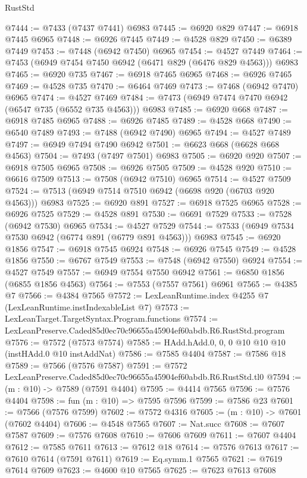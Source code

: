 \begin{lexlean}{RustStd}
\begin{coremodule}
@7444 := @7433 (@7437 @7441) @6983
@7445 := @6920 @829
@7447 := @6918 @7445 @6965
@7448 := @6926 @7445
@7449 := @4528 @829
@7450 := @6389 @7449
@7453 := @7448 (@6942 @7450) @6965
@7454 := @4527 @7449
@7464 := @7453 (@6949 @7454 @7450 @6942 (@6471 @829 (@6476 @829 @4563))) @6983
@7465 := @6920 @735
@7467 := @6918 @7465 @6965
@7468 := @6926 @7465
@7469 := @4528 @735
@7470 := @6464 @7469
@7473 := @7468 (@6942 @7470) @6965
@7474 := @4527 @7469
@7484 := @7473 (@6949 @7474 @7470 @6942 (@6547 @735 (@6552 @735 @4563))) @6983
@7485 := @6920 @668
@7487 := @6918 @7485 @6965
@7488 := @6926 @7485
@7489 := @4528 @668
@7490 := @6540 @7489
@7493 := @7488 (@6942 @7490) @6965
@7494 := @4527 @7489
@7497 := @6949 @7494 @7490 @6942
@7501 := @6623 @668 (@6628 @668 @4563)
@7504 := @7493 (@7497 @7501) @6983
@7505 := @6920 @920
@7507 := @6918 @7505 @6965
@7508 := @6926 @7505
@7509 := @4528 @920
@7510 := @6616 @7509
@7513 := @7508 (@6942 @7510) @6965
@7514 := @4527 @7509
@7524 := @7513 (@6949 @7514 @7510 @6942 (@6698 @920 (@6703 @920 @4563))) @6983
@7525 := @6920 @891
@7527 := @6918 @7525 @6965
@7528 := @6926 @7525
@7529 := @4528 @891
@7530 := @6691 @7529
@7533 := @7528 (@6942 @7530) @6965
@7534 := @4527 @7529
@7544 := @7533 (@6949 @7534 @7530 @6942 (@6774 @891 (@6779 @891 @4563))) @6983
@7545 := @6920 @1856
@7547 := @6918 @7545 @6924
@7548 := @6926 @7545
@7549 := @4528 @1856
@7550 := @6767 @7549
@7553 := @7548 (@6942 @7550) @6924
@7554 := @4527 @7549
@7557 := @6949 @7554 @7550 @6942
@7561 := @6850 @1856 (@6855 @1856 @4563)
@7564 := @7553 (@7557 @7561) @6961
@7565 := @4385 @7
@7566 := @4384 @7565
@7572 := LexLeanRuntime.index @4255 @7 (LexLeanRuntime.instIndexableList @7)
@7573 := LexLeanTarget.TargetSyntax.Program.functions
@7574 := LexLeanPreserve.Caded85d0ec70c96655a45904ef60abdb.R6.RustStd.program
@7576 := @7572 (@7573 @7574)
@7585 := HAdd.hAdd.{0, 0, 0} @10 @10 @10 (instHAdd.{0} @10 instAddNat)
@7586 := @7585 @4404
@7587 := @7586 @18
@7589 := @7566 (@7576 @7587)
@7591 := @7572 LexLeanPreserve.Caded85d0ec70c96655a45904ef60abdb.R6.RustStd.tl0
@7594 := (m : @10) -> @7589 (@7591 @4404)
@7595 := @4414 @7565
@7596 := @7576 @4404
@7598 := fun (m : @10) => @7595 @7596
@7599 := @7586 @23
@7601 := @7566 (@7576 @7599)
@7602 := @7572 @4316
@7605 := (m : @10) -> @7601 (@7602 @4404)
@7606 := @4548 @7565
@7607 := Nat.succ
@7608 := @7607 @7587
@7609 := @7576 @7608
@7610 := @7606 @7609
@7611 := @7607 @4404
@7612 := @7585 @7611
@7613 := @7612 @18
@7614 := @7576 @7613
@7617 := @7610 @7614 (@7591 @7611)
@7619 := Eq.symm.{1} @7565
@7621 := @7619 @7614 @7609
@7623 := @4600 @10 @7565
@7625 := @7623 @7613 @7608

\end{coremodule}
\end{lexlean}
